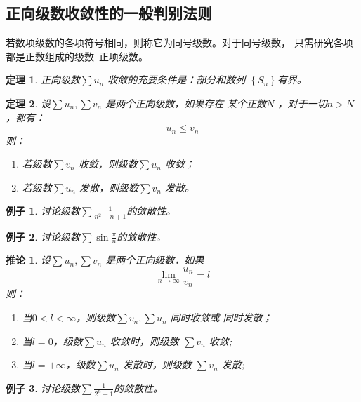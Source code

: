 \documentclass[a4paper,12pt]{article}
\newtheorem{theorem}{定理}
\newtheorem{example}{例子}
\newtheorem{corollary}{推论}
\begin{document}
\subsection{正向级数收敛性的一般判别法则}
    若数项级数的各项符号相同，则称它为同号级数。对于同号级数，
只需研究各项都是正数组成的级数--正项级数。
\begin{theorem}
    正向级数$\displaystyle \sum u_n$ 收敛的充要条件是：部分和数列
    $\displaystyle \left\{S_n\right\}$有界。
\end{theorem}
\begin{theorem}
    设$\displaystyle \sum u_n, \sum v_n$ 是两个正向级数，如果存在
    某个正数$N$ ，对于一切$n > N$，都有：
    \[
        u_n \le v_n
        \]
    则：
    \begin{enumerate}[label={\rm(\arabic*)}]
        \item 若级数$\displaystyle \sum v_n$ 收敛，则级数$\displaystyle \sum u_n$ 收敛；
        \item 若级数$\displaystyle \sum u_n$ 发散，则级数$\displaystyle \sum v_n$ 发散。
    \end{enumerate}
\end{theorem}

\begin{example}
    讨论级数$\displaystyle \sum \frac{1}{n^2 - n + 1}$的敛散性。
\end{example}

\begin{example}
    讨论级数$\displaystyle \sum \sin \frac{\pi}{n}$的敛散性。
\end{example}

\begin{corollary}
    设$\displaystyle \sum u_n, \sum v_n$ 是两个正向级数，如果
    \[
        \lim_{n \to \infty} \frac{u_n}{v_n} = l
        \]
    则：
    \begin{enumerate}[label={\rm(\arabic*)}]
        \item 当$0 < l < \infty$，则级数$\displaystyle \sum v_n, \sum u_n$ 同时收敛或
            同时发散；
        \item 当$l = 0$，级数$\displaystyle \sum u_n$ 收敛时，则级数
            $\displaystyle \sum v_n$ 收敛;
        \item 当$l = +\infty$，级数$\displaystyle \sum u_n$ 发散时，则级数
            $\displaystyle \sum v_n$ 发散;
    \end{enumerate}
\end{corollary}

\begin{example}
    讨论级数$\displaystyle \sum \frac{1}{2^n-1}$的敛散性。
\end{example}
\end{document}
